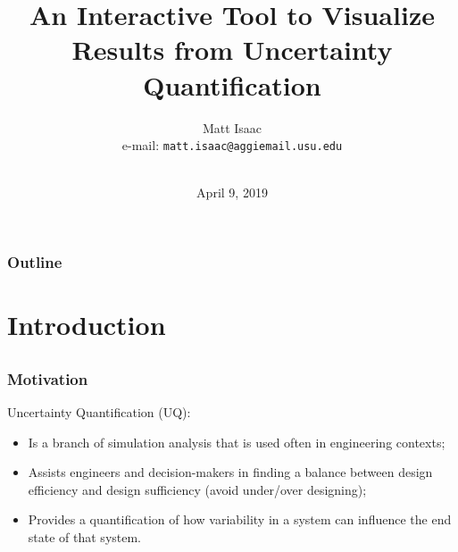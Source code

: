 \documentclass[handout, xcolor=dvipsnames]{beamer}
\begin{document}

\title[\hspace*{0.5cm} Statistical Visualization II, Utah State University
	   \hspace*{80pt}\hfill \insertframenumber\hspace*{0.5cm}]
       {An Interactive Tool to Visualize Results from Uncertainty Quantification}


\author[\hspace*{0cm}Matt Isaac --- April 9, 2019\hspace*{0.25cm}]
		{Matt Isaac\\
		e-mail: \tt{matt.isaac@aggiemail.usu.edu} \\[-0.8cm]
		~ \\
		}


\date{April 9, 2019}


\frame{
  \titlepage
}


\AtBeginSection[]
{
  \begin{frame}<beamer>{outline}
    \frametitle{Outline}
    \small
    \tableofcontents[currentsection]%
    \normalsize
  \end{frame}
}






\begin{frame} 
\frametitle{Outline}
  \tableofcontents
\end{frame}


\section{Introduction}  

\subsection{}
\begin{frame}
	\frametitle{Motivation}
	Uncertainty Quantification (UQ):
	\begin{itemize}
    	\item Is a branch of simulation analysis that is used often in engineering contexts; 
    	\item Assists engineers and decision-makers in finding a balance between design efficiency and design sufficiency (avoid under/over designing);
    	\item Provides a quantification of how variability in a system can influence the end state of that system. 
    \end{itemize}
\end{frame}
\end{document}
